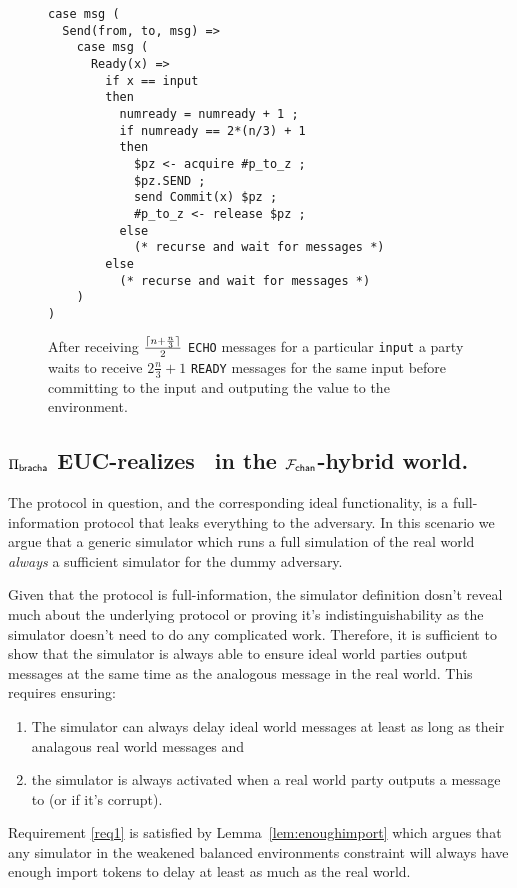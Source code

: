 \begin{figure}
\begin{lstlisting}[basicstyle=\small\ttfamily, frame=single]
case msg (
  Send(from, to, msg) =>
    case msg (
      Ready(x) =>
        if x == input
        then
          numready = numready + 1 ;
          if numready == 2*(n/3) + 1
          then
            $pz <- acquire #p_to_z ;
            $pz.SEND ;
            send Commit(x) $pz ;
            #p_to_z <- release $pz ;
          else
            (* recurse and wait for messages *)
        else
          (* recurse and wait for messages *)
    )
)
\end{lstlisting}
\caption{After receiving $\frac{\lceil n + \frac{n}{3}\rceil}{2}$ \texttt{ECHO} messages for a particular \texttt{input} a party waits to receive $2 \frac{n}{3} + 1$ \texttt{READY} messages for the same input before committing to the input and outputing the value to the environment.}
\label{fig:nomos:ready}
\end{figure}


\subsection{$\Pi_{{\mathsf {bracha}}}$ EUC-realizes \Frbc~in the $\mathcal{F}_{{\mathsf {chan}}}$-hybrid world.}
The protocol in question, and the corresponding ideal functionality, is a full-information protocol that leaks everything to the adversary.
In this scenario we argue that a generic simulator which runs a full simulation of the real world \textit{always} a sufficient simulator for the dummy adversary.

Given that the protocol is full-information, the simulator definition dosn't reveal much about the underlying protocol or proving it's indistinguishability as the simulator doesn't need to do any complicated work.
Therefore, it is sufficient to show that the simulator is always able to ensure ideal world parties output messages at the same time as the analogous message in the real world.
This requires ensuring:
\begin{enumerate}
\item \label{req1} The simulator can always delay ideal world messages at least as long as their analagous real world messages and
\item \label{req2} the simulator is always activated when a real world party outputs a message to \Environment (or \Adversary if it's corrupt).
\end{enumerate}

Requirement \ref{req1} is satisfied by Lemma~\ref{lem:enoughimport} which argues that any simulator in the weakened balanced environments constraint will always have enough import tokens to delay at least as much as the real world.


